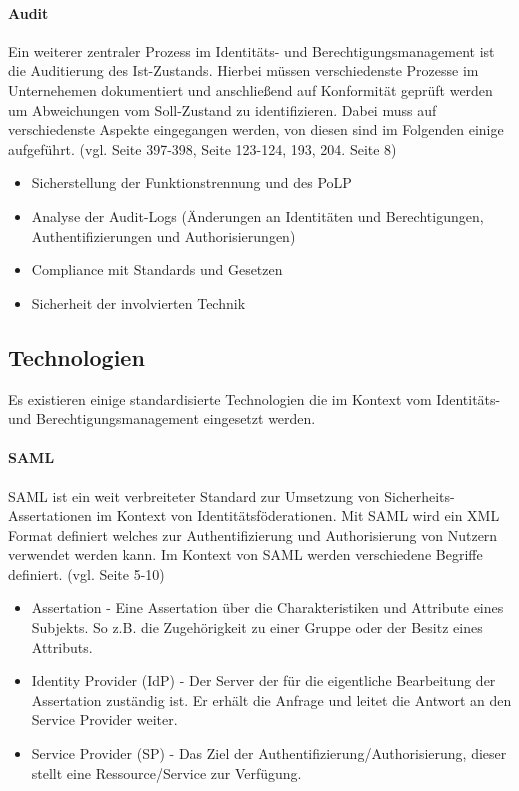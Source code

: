 \documentclass[11pt]{article}
\begin{document}
\paragraph{Audit}
Ein weiterer zentraler Prozess im Identitäts- und Berechtigungsmanagement ist die Auditierung des Ist-Zustands. Hierbei müssen verschiedenste Prozesse im Unternehemen dokumentiert und anschließend auf Konformität geprüft werden um Abweichungen vom Soll-Zustand zu identifizieren. Dabei muss auf verschiedenste Aspekte eingegangen werden, von diesen sind im Folgenden einige aufgeführt. (vgl. \cite{devlekar2022identity} Seite 397-398, \cite{tsolkas2017} Seite 123-124, 193, 204. \cite{haag2012selecting} Seite 8)
\begin{itemize}
  \item Sicherstellung der Funktionstrennung und des PoLP
  \item Analyse der Audit-Logs (Änderungen an Identitäten und Berechtigungen, Authentifizierungen und Authorisierungen)
  \item Compliance mit Standards und Gesetzen
  \item Sicherheit der involvierten Technik
\end{itemize}
\subsection{Technologien}
Es existieren einige standardisierte Technologien die im Kontext vom Identitäts- und Berechtigungsmanagement eingesetzt werden.
\paragraph{SAML}
SAML ist ein weit verbreiteter Standard zur Umsetzung von Sicherheits-Assertationen im Kontext von Identitätsföderationen. Mit SAML wird ein XML Format definiert welches zur Authentifizierung und Authorisierung von Nutzern verwendet werden kann. Im Kontext von SAML werden verschiedene Begriffe definiert. (vgl. \cite{hughes2005security} Seite 5-10)
\begin{itemize}
  \item Assertation - Eine Assertation über die Charakteristiken und Attribute eines Subjekts. So z.B. die Zugehörigkeit zu einer Gruppe oder der Besitz eines Attributs.
  \item Identity Provider (IdP) - Der Server der für die eigentliche Bearbeitung der Assertation zuständig ist. Er erhält die Anfrage und leitet die Antwort an den Service Provider weiter.
  \item Service Provider (SP) - Das Ziel der Authentifizierung/Authorisierung, dieser stellt eine Ressource/Service zur Verfügung.
\end{itemize}
\end{document}
